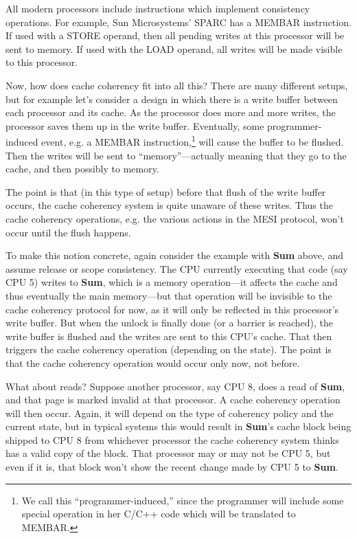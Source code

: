All modern processors include instructions which implement consistency
operations.  For example, Sun Microsystems' SPARC has a MEMBAR
instruction.  If used with a STORE operand, then all pending writes at
this processor will be sent to memory.  If used with the LOAD operand,
all writes will be made visible to this processor.

Now, how does cache coherency fit into all this?  There are many
different setups, but for example let's consider a design in which there
is a write buffer between each processor and its cache.  As the
processor does more and more writes, the processor saves them up in the
write buffer.  Eventually, some programmer-induced event, e.g. a MEMBAR
instruction,\footnote{We call this ``programmer-induced,'' since the
programmer will include some special operation in her C/C++ code which
will be translated to MEMBAR.} will cause the buffer to be flushed.
Then the writes will be sent to ``memory''---actually meaning that they
go to the cache, and then possibly to memory.

The point is that (in this type of setup) before that flush of the write
buffer occurs, the cache coherency system is quite unaware of these
writes.  Thus the cache coherency operations, e.g. the various actions
in the MESI protocol, won't occur until the flush happens.

To make this notion concrete, again consider the example with {\bf Sum}
above, and assume release or scope consistency.  The CPU currently
executing that code (say CPU 5) writes to {\bf Sum}, which is
a memory operation---it affects the cache and thus eventually the main
memory---but that operation will be invisible to the cache coherency
protocol for now, as it will only be reflected in this processor's write
buffer.  But when the unlock is finally done (or a barrier is reached),
the write buffer is flushed and the writes are sent to this CPU's cache.
That then triggers the cache coherency operation (depending on the
state).  The point is that the cache coherency operation would occur
only now, not before.

What about reads?  Suppose another processor, say CPU 8, does a read of
{\bf Sum}, and that page is marked invalid at that processor.  A cache
coherency operation will then occur.  Again, it will depend on the type
of coherency policy and the current state, but in typical systems this
would result in {\bf Sum}'s cache block being shipped to CPU 8 from
whichever processor the cache coherency system thinks has a valid copy
of the block.  That processor may or may not be CPU 5, but even if it
is, that block won't show the recent change made by CPU 5 to {\bf Sum}.

